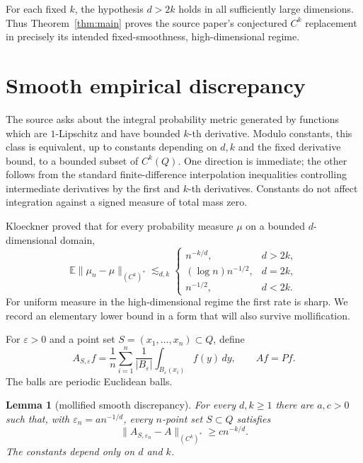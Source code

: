 \documentclass[11pt]{article}
\newtheorem{lemma}[theorem]{Lemma}
\newcommand{\E}{\mathbb E}
\begin{document}
For each fixed $k$, the hypothesis $d>2k$ holds in all sufficiently large
dimensions.  Thus Theorem~\ref{thm:main} proves the source paper's conjectured
$C^k$ replacement in precisely its intended fixed-smoothness,
high-dimensional regime.

\section{Smooth empirical discrepancy}

The source asks about the integral probability metric generated by functions
which are $1$-Lipschitz and have bounded $k$-th derivative.  Modulo constants,
this class is equivalent, up to constants depending on $d,k$ and the fixed
derivative bound, to a bounded subset of $C^k(Q)$.  One direction is immediate;
the other follows from the standard finite-difference interpolation
inequalities controlling intermediate derivatives by the first and $k$-th
derivatives.  Constants do not affect integration against a signed measure of
total mass zero.

Kloeckner proved that for every probability measure $\mu$ on a bounded
$d$-dimensional domain,
\begin{equation}\label{eq:known-upper}
 \E\|\mu_n-\mu\|_{(C^k)^*}\lesssim_{d,k}
 \begin{cases}
 n^{-k/d},&d>2k,\\
 (\log n)n^{-1/2},&d=2k,\\
 n^{-1/2},&d<2k.
 \end{cases}
\end{equation}
For uniform measure in the high-dimensional regime the first rate is sharp.
We record an elementary lower bound in a form that will also survive
mollification.

For $\varepsilon>0$ and a point set $S=(x_1,\dots,x_n)\subset Q$, define
\begin{equation}\label{eq:average}
 A_{S,\varepsilon}f
 =\frac1n\sum_{i=1}^n\frac1{|B_\varepsilon|}
   \int_{B_\varepsilon(x_i)}f(y)\,dy,
 \qquad Af=Pf.
\end{equation}
The balls are periodic Euclidean balls.

\begin{lemma}[mollified smooth discrepancy]\label{lem:bump}
For every $d,k\ge1$ there are $a,c>0$ such that, with
$\varepsilon_n=a n^{-1/d}$, every $n$-point set $S\subset Q$ satisfies
\begin{equation}\label{eq:ylower}
 \|A_{S,\varepsilon_n}-A\|_{(C^k)^*}\ge c n^{-k/d}.
\end{equation}
The constants depend only on $d$ and $k$.
\end{lemma}
\end{document}
